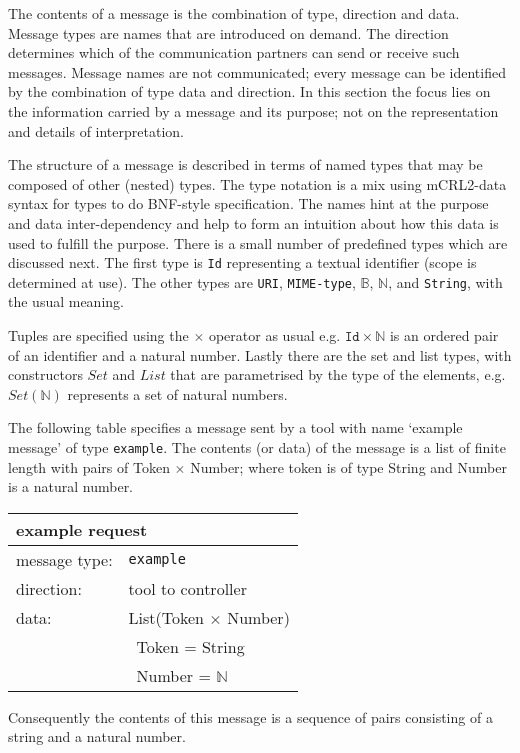 \documentclass{article}
\newcommand{\msg}[1]{\texttt{#1}}
\begin{document}
   The contents of a message is the combination of type, direction and data.
   Message types are names that are introduced on demand. The direction
   determines which of the communication partners can send or receive such
   messages. Message names are not communicated; every message can be
   identified by the combination of type data and direction. In this section
   the focus lies on the information carried by a message and its purpose; not
   on the representation and details of interpretation.
   
   The structure of a message is described in terms of named types that may be
   composed of other (nested) types. The type notation is a mix using
   mCRL2-data syntax for types to do BNF-style specification.  The names hint
   at the purpose and data inter-dependency and help to form an intuition about
   how this data is used to fulfill the purpose.  There is a small number of
   predefined types which are discussed next. The first type is \texttt{Id}
   representing a textual identifier (scope is determined at use). The other
   types are \texttt{URI}, \texttt{MIME-type}, $\mathbb{B}$, $\mathbb{N}$,
   and \texttt{String}, with the usual meaning.

   Tuples are specified using the $\times$ operator as usual e.g. $\texttt{Id}
   \times \mathbb{N}$ is an ordered pair of an identifier and a natural number.
   Lastly there are the set and list types, with constructors $Set$ and $List$
   that are parametrised by the type of the elements, e.g.  $Set(\mathbb{N})$
   represents a set of natural numbers.
   
   The following table specifies a message sent by a tool with name `example
   message' of type \msg{example}.  The contents (or data) of the message is a
   list of finite length with pairs of Token $\times$ Number; where token is of
   type String and Number is a natural number.

   \begin{table}[H]
    \begin{center}
     \begin{tabular}{|ll|}
      \hline
       \multicolumn{2}{|l|}{\textbf{example request}} \\
      \hline
       message type:    & \msg{example} \\
      \hline
       direction:       & tool to controller \\
       data:            & List(Token $\times$ Number) \\
                        & \ Token  = String \\
                        & \ Number = $\mathbb{N}$ \\
      \hline
     \end{tabular}
     \vspace{-0.3cm}
    \end{center}
    \label{table:example_message}
   \end{table}
   \noindent Consequently the contents of this message is a sequence of pairs
   consisting of a string and a natural number.
\end{document}
